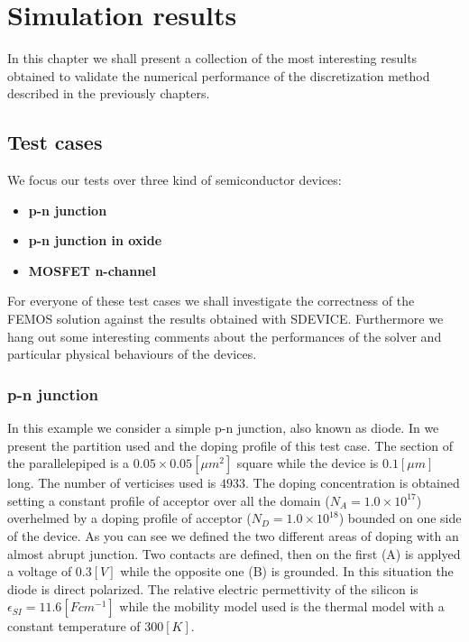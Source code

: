 \chapter{Simulation results}

In this chapter we shall present a collection of the most interesting results obtained to validate the numerical performance of the discretization method described in the previously chapters. 

\section{Test cases}

We focus our tests over three kind of semiconductor devices: 

\begin{itemize}
\item {\bf p-n junction}
\item {\bf p-n junction in oxide}
\item {\bf MOSFET n-channel}
\end{itemize}

For everyone of these test cases we shall investigate the correctness of the FEMOS solution against the results obtained with SDEVICE.  
Furthermore we hang out some interesting comments about the performances of the solver and particular physical behaviours of the devices.

\subsection{p-n junction}
\label{sec: PN}

In this example we consider a simple p-n junction, also known as diode. In  we present the partition used and the doping profile of this test case. The section of the parallelepiped is a $0.05 \times 0.05 [\mu m^2]$ square while the device is $0.1 [\mu m]$ long.  The number of verticises used is $4933$.  The doping concentration is obtained setting a constant profile of acceptor over all the domain ($N_A = 1.0\times 10^{17}$) overhelmed by a doping profile of acceptor ($N_D=1.0 \times 10^{18}$) bounded on one side of the device. As you can see we defined the two different areas of doping with an almost abrupt junction. 
Two contacts are defined, then on the first (A) is applyed a voltage of $0.3[V]$ while the opposite one (B) is grounded. In this situation the diode is direct polarized. The  relative electric permettivity of the silicon is $\epsilon_{SI} = 11.6 [F cm^{-1}]$ while the mobility model used is the thermal model  with a constant temperature of $300 [K]$.

